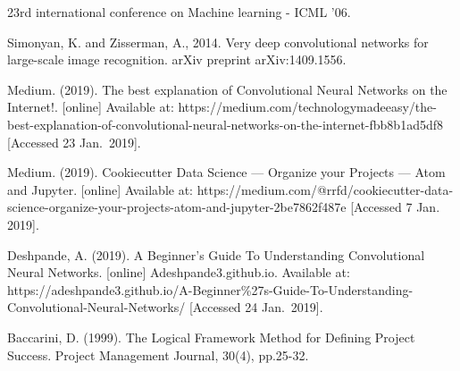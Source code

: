 \documentclass[11pt]{article}
\begin{document}
23rd international conference on Machine learning - ICML '06.

Simonyan, K. and Zisserman, A., 2014. Very deep convolutional networks
for large-scale image recognition. arXiv preprint arXiv:1409.1556.

Medium. (2019). The best explanation of Convolutional Neural Networks on
the Internet!. {[}online{]} Available at:
https://medium.com/technologymadeeasy/the-best-explanation-of-convolutional-neural-networks-on-the-internet-fbb8b1ad5df8
{[}Accessed 23 Jan.~2019{]}.

Medium. (2019). Cookiecutter Data Science --- Organize your Projects ---
Atom and Jupyter. {[}online{]} Available at:
https://medium.com/@rrfd/cookiecutter-data-science-organize-your-projects-atom-and-jupyter-2be7862f487e
{[}Accessed 7 Jan. 2019{]}.

Deshpande, A. (2019). A Beginner's Guide To Understanding Convolutional
Neural Networks. {[}online{]} Adeshpande3.github.io. Available at:
https://adeshpande3.github.io/A-Beginner\%27s-Guide-To-Understanding-Convolutional-Neural-Networks/
{[}Accessed 24 Jan.~2019{]}.

Baccarini, D. (1999). The Logical Framework Method for Defining Project
Success. Project Management Journal, 30(4), pp.25-32.


    
    
    
    
\end{document}
